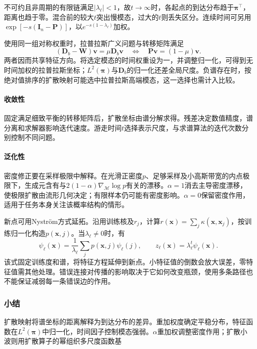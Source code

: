 不可约且非周期的有限链满足$|\lambda_\ell|<1$，故$t\to\infty$时，各起点的到达分布趋于$\bm{\pi}^{\top}$，距离也趋于零。混合前的较大$t$突出慢模态，过大的$t$则丢失区分。连续时间可另用$\exp[-s(\bm{I}_n-\bm{P})]$，以$e^{-s(1-\lambda_\ell)}$加权。

使用同一组对称权重时，拉普拉斯广义问题与转移矩阵满足
\[
  (\bm{D}_b-\bm{W})\bm{v}=\mu\bm{D}_b\bm{v}
  \quad\Longleftrightarrow\quad
  \bm{P}\bm{v}=(1-\mu)\bm{v}.
\]
两者因而共享特征方向。将选定模态的时间权重设为一，并调整归一化，可得到无时间加权的拉普拉斯坐标；$L^2(\bm{\pi})$与$\bm{D}_b$的归一化还差全局尺度。负谱存在时，按绝对值排序的扩散映射可能选中拉普拉斯高端模态，这一选择也需计入比较。

\paragraph{收敛性}
固定满足细致平衡的转移矩阵后，扩散坐标由谱分解求得。残差决定数值精度，谱分离和求解器影响迭代速度。游走时间$t$选择表示尺度，与求谱算法的迭代次数分别控制不同问题。

\paragraph{泛化性}

密度修正要在采样极限中解释。在光滑正密度$p$、足够采样及小高斯带宽的内点极限下，生成元含有与$2(1-\alpha)\nabla_{\mathcal{M}}\log p$有关的漂移。$\alpha=1$消去主导密度漂移，使极限扩散由流形几何决定；有限样本仍可能有密度影响。$\alpha=0$保留密度作用，适用于任务本身关注该概率结构的情形。

新点可用Nystr\"om方式延拓。沿用训练核及$r_j$，计算$r(\bm{x})=\sum_j\kappa(\bm{x},\bm{x}_j)$，按训练归一化构造$p(\bm{x},j)$。当$\lambda_\ell\ne0$时，有
\begin{equation}
  \label{eq:dim-diffusion-extension}
  \psi_\ell(\bm{x})
  =\frac1{\lambda_\ell}\sum_jp(\bm{x},j)\psi_\ell(j),
  \qquad
  z_\ell(\bm{x})=\lambda_\ell^t\psi_\ell(\bm{x}).
\end{equation}
该式固定训练度和谱，将特征方程延伸到新点。小特征值的倒数会放大误差，零特征值需其他处理。错误连接对传播的影响取决于它如何改变瓶颈，使用多条路径也不能保证减弱每一条错误边的作用。

\subsubsection{小结}

扩散映射将谱坐标的距离解释为到达分布的差异。重加权度确定平稳分布，特征函数在$L^2(\bm{\pi})$中归一化，时间因子控制模态强弱。$\alpha$重加权调整密度作用；扩散小波则用扩散算子的幂组织多尺度函数基

